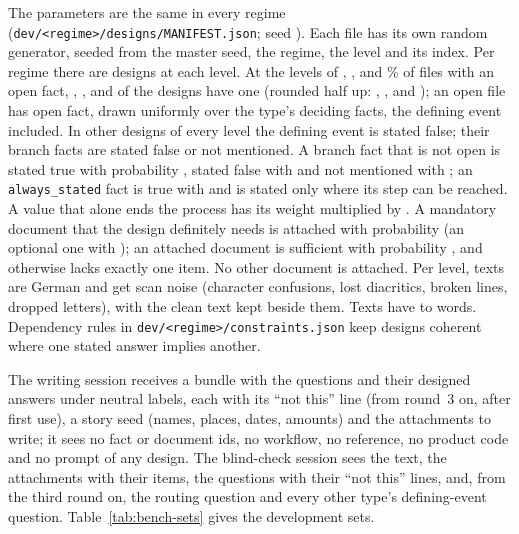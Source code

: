 The parameters are the same in every regime (\texttt{dev/\allowbreak{}<regime>/\allowbreak{}designs/\allowbreak{}MANIFEST.json}; seed \sfourdevSeed). Each file has its own random generator, seeded from the master seed, the regime, the level and its index. Per regime there are \sfourdevPerLevel{} designs at each level. At the levels of \sfourdevLevelA, \sfourdevLevelB, \sfourdevLevelC{} and \sfourdevLevelD\% of files with an open fact, \sfourdevLevelAOpenFiles, \sfourdevLevelBOpenFiles, \sfourdevLevelCOpenFiles{} and \sfourdevLevelDOpenFiles{} of the \sfourdevPerLevel{} designs have one (rounded half up: \sfourdevLevelAOpenShare, \sfourdevLevelBOpenShare, \sfourdevLevelCOpenShare{} and \sfourdevLevelDOpenShare); an open file has \sfourdevOpenFactsPerFile{} open fact, drawn uniformly over the type's deciding facts, the defining event included. In \sfourdevDeniedPerLevel{} other designs of every level the defining event is stated false; their branch facts are stated false or not mentioned. A branch fact that is not open is stated true with probability \sfourdevPTrue, stated false with \sfourdevPFalse{} and not mentioned with \sfourdevPNotMentioned; an \texttt{always\_stated} fact is true with \sfourdevPAlwaysStatedTrue{} and is stated only where its step can be reached. A value that alone ends the process has its weight multiplied by \sfourdevStopLean. A mandatory document that the design definitely needs is attached with probability \sfourdevPSupply{} (an optional one with \sfourdevPSupplyOptional); an attached document is sufficient with probability \sfourdevPSufficient, and otherwise lacks exactly one item. No other document is attached. Per level, \sfourdevGermanPerLevel{} texts are German and \sfourdevNoisePerLevel{} get scan noise (character confusions, lost diacritics, broken lines, dropped letters), with the clean text kept beside them. Texts have \sfourdevWordsMin{} to \sfourdevWordsMax{} words. Dependency rules in \texttt{dev/\allowbreak{}<regime>/\allowbreak{}constraints.json} keep designs coherent where one stated answer implies another.

The writing session receives a bundle with the questions and their designed answers under neutral labels, each with its ``not this'' line (from round~3 on, after first use), a story seed (names, places, dates, amounts) and the attachments to write; it sees no fact or document ids, no workflow, no reference, no product code and no prompt of any design. The blind-check session sees the text, the attachments with their items, the questions with their ``not this'' lines, and, from the third round on, the routing question and every other type's defining-event question. Table~\ref{tab:bench-sets} gives the development sets.

